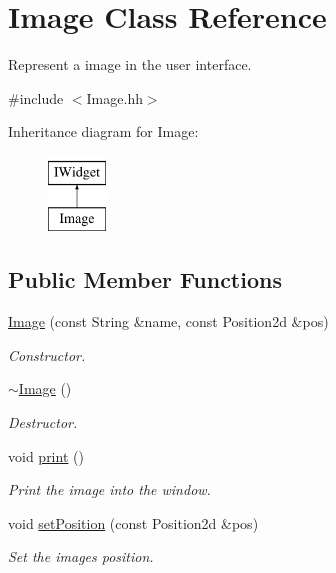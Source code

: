 \hypertarget{classImage}{}\section{Image Class Reference}
\label{classImage}


Represent a image in the user interface.  




{\ttfamily \#include $<$Image.\+hh$>$}

Inheritance diagram for Image\+:\begin{figure}[H]
\begin{center}
\leavevmode
\includegraphics[height=2.000000cm]{classImage}
\end{center}
\end{figure}
\subsection*{Public Member Functions}
\begin{DoxyCompactItemize}
\item 
\hyperlink{classImage_aca308a45e7c53ec95e244863cb31a738}{Image} (const String \&name, const Position2d \&pos)
\begin{DoxyCompactList}\small\item\em Constructor. \end{DoxyCompactList}\item 
\mbox{\label{classImage_a0294f63700543e11c0f0da85601c7ae5}} 
\hyperlink{classImage_a0294f63700543e11c0f0da85601c7ae5}{$\sim$\+Image} ()
\begin{DoxyCompactList}\small\item\em Destructor. \end{DoxyCompactList}\item 
\mbox{\label{classImage_a1c98ca475ce45aaa71e8a91a2a781ff5}} 
void \hyperlink{classImage_a1c98ca475ce45aaa71e8a91a2a781ff5}{print} ()
\begin{DoxyCompactList}\small\item\em Print the image into the window. \end{DoxyCompactList}\item 
\mbox{\label{classImage_a8a781889a88d1757620c61501d24d394}} 
void \hyperlink{classImage_a8a781889a88d1757620c61501d24d394}{set\+Position} (const Position2d \&pos)
\begin{DoxyCompactList}\small\item\em Set the image\textquotesingle{}s position. \end{DoxyCompactList}\end{DoxyCompactItemize}


